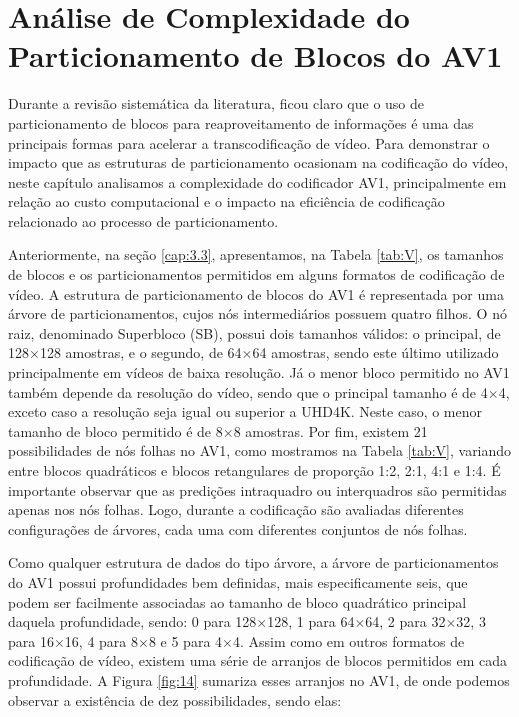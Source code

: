 \chapter{Análise de Complexidade do Particionamento de Blocos do AV1}
\label{cap:5}

Durante a revisão sistemática da literatura, ficou claro que o uso de particionamento de blocos para reaproveitamento de informações é uma das principais formas para acelerar a transcodificação de vídeo. Para demonstrar o impacto que as estruturas de particionamento ocasionam na codificação do vídeo, neste capítulo analisamos a complexidade do codificador AV1, principalmente em relação ao custo computacional e o impacto na eficiência de codificação relacionado ao processo de particionamento.

Anteriormente, na seção \ref{cap:3.3}, apresentamos, na Tabela \ref{tab:V}, os tamanhos de blocos e os particionamentos permitidos em alguns formatos de codificação de vídeo. A estrutura de particionamento de blocos do AV1 é representada por uma árvore de particionamentos, cujos nós intermediários possuem quatro filhos. O nó raiz, denominado Superbloco (SB), possui dois tamanhos válidos: o principal, de 128$\times$128 amostras, e o segundo, de 64$\times$64 amostras, sendo este último utilizado principalmente em vídeos de baixa resolução. Já o menor bloco permitido no AV1 também depende da resolução do vídeo, sendo que o principal tamanho é de 4$\times$4, exceto caso a resolução seja igual ou superior a UHD4K. Neste caso, o menor tamanho de bloco permitido é de 8$\times$8 amostras. Por fim, existem 21 possibilidades de nós folhas no AV1, como mostramos na Tabela \ref{tab:V}, variando entre blocos quadráticos e blocos retangulares de proporção 1:2, 2:1, 4:1 e 1:4. É importante observar que as predições intraquadro ou interquadros são permitidas apenas nos nós folhas. Logo, durante a codificação são avaliadas diferentes configurações de árvores, cada uma com diferentes conjuntos de nós folhas.

Como qualquer estrutura de dados do tipo árvore, a árvore de particionamentos do AV1 possui profundidades bem definidas, mais especificamente seis, que podem ser facilmente associadas ao tamanho de bloco quadrático principal daquela profundidade, sendo: 0 para 128$\times$128, 1 para 64$\times$64, 2 para 32$\times$32, 3 para 16$\times$16, 4 para 8$\times$8 e 5 para 4$\times$4. Assim como em outros formatos de codificação de vídeo, existem uma série de arranjos de blocos permitidos em cada profundidade. A Figura \ref{fig:14} sumariza esses arranjos no AV1, de onde podemos observar a existência de dez possibilidades, sendo elas:

